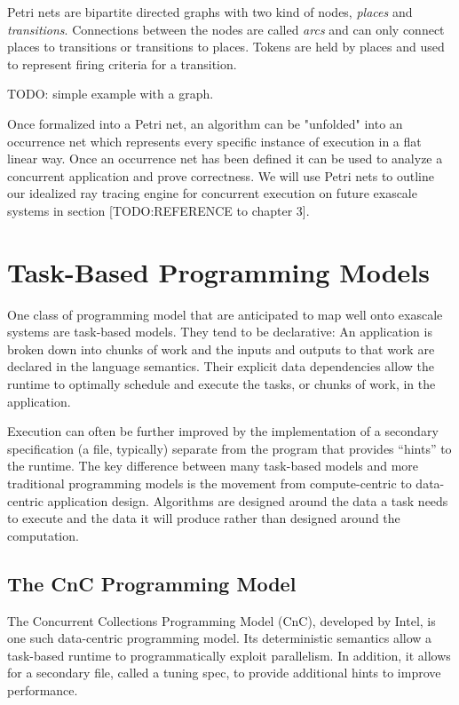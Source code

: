 Petri nets are bipartite directed graphs with two kind of nodes, \emph{places}
and \emph{transitions}.  Connections between the nodes are called \emph{arcs}
and can only connect places to transitions or transitions to places.  Tokens are
held by places and used to represent firing criteria for a transition.

TODO: simple example with a graph.

Once formalized into a Petri net, an algorithm can be "unfolded" into an 
occurrence net which represents every specific instance of execution in a flat
linear way.  Once an occurrence net has been defined it can be used to analyze a
concurrent application and prove correctness.  We will use Petri nets to outline
our idealized ray tracing engine for concurrent execution on future exascale 
systems in section [TODO:REFERENCE to chapter 3].  

\section{Task-Based Programming Models}
\label{sec:task-based}

One class of programming model that are anticipated to map well onto exascale 
systems are task-based models. They tend to be declarative: An application is
broken down into chunks of work and the inputs and outputs to that work are 
declared in the language semantics. Their explicit data dependencies allow the 
runtime to optimally schedule and execute the tasks, or chunks of work, in the 
application.

Execution can often be further improved by the implementation of a
secondary specification (a file, typically) separate from the program
that provides ``hints'' to the runtime. The key difference between many
task-based models and more traditional programming models is the
movement from compute-centric to data-centric application design.
Algorithms are designed around the data a task needs to execute and
the data it will produce rather than designed around the computation.

\subsection{The CnC Programming Model}
\label{sec:cnc}

The Concurrent Collections Programming Model (CnC), developed by
Intel, is one such data-centric programming model. Its deterministic
semantics allow a task-based runtime to programmatically exploit
parallelism. In addition, it allows for a secondary file, called a
tuning spec, to provide additional hints to improve performance.

